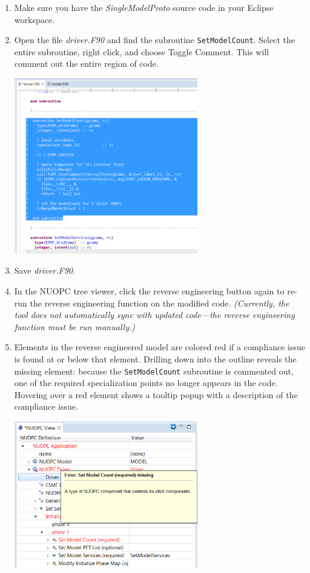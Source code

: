 \documentclass[oneside,11pt]{memoir}
\begin{document}
\begin{enumerate}

\item Make sure you have the \emph{SingleModelProto} source code in your Eclipse workspace.

\item Open the file \emph{driver.F90} and find the subroutine \texttt{SetModelCount}.  Select the entire subroutine, right click, and choose Toggle Comment.  This will comment out the entire region of code.

\parbox{\linewidth}{\centering
  \includegraphics[width=8cm]{figs/verify_fig1.png}
}

\item Save \emph{driver.F90}.

\item In the NUOPC tree viewer, click the reverse engineering button again to re-run the reverse engineering function on the modified code.  \textit{(Currently, the tool does not automatically sync with updated code---the reverse engineering function must be run manually.)}  

\item Elements in the reverse engineered model are colored red if a compliance issue is found at or below that element.  Drilling down into the outline reveals the missing element: because the \texttt{SetModelCount} subroutine is commented out, one of the required specialization points no longer appears in the code.  Hovering over a red element shows a tooltip popup with a description of the compliance issue.

\parbox{\linewidth}{\centering
  \includegraphics[width=8cm]{figs/verify_fig3.png}
}

\end{enumerate}
\end{document}
